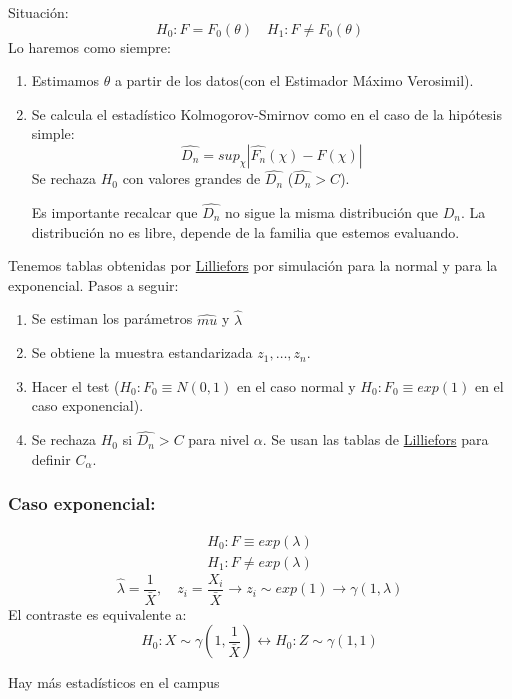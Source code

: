 Situación:
\[
H_0: F=F_0(\theta) \quad H_1:F \neq F_0(\theta)
\]
Lo haremos como siempre:
\begin{enumerate}
    \item Estimamos $\theta$ a partir de los datos(con el Estimador Máximo Verosimil).
    \item Se calcula el estadístico Kolmogorov-Smirnov como en el caso de la hipótesis simple:
    \[
    \widehat{D_n}=sup_\chi|\widehat{F_n}(\chi)-F(\chi)|
    \]
    Se rechaza $H_0$ con valores grandes de $\widehat{D_n}$ ($\widehat{D_n}>C$). 
    
    Es importante recalcar que $\widehat{D_n}$ no sigue la misma distribución que $D_n$.
    La distribución no es libre, depende de la familia que estemos evaluando.
\end{enumerate}

Tenemos tablas obtenidas por \href{https://es.wikipedia.org/wiki/Prueba_de_Lilliefors}{Lilliefors}
por simulación para la normal y para la exponencial.
Pasos a seguir:
\begin{enumerate}
    \item Se estiman los parámetros $\widehat{mu}$ y $\widehat{\lambda}$
    \item Se obtiene la muestra estandarizada $z_1,\dots,z_n$.
    \item Hacer el test ($H_0:F_0 \equiv N(0,1)$ en el caso normal y $H_0:F_0\equiv exp(1)$ en el caso exponencial).
    \item Se rechaza $H_0$ si $\widehat{D_n}>C$ para nivel $\alpha$. Se usan las tablas de \href{https://es.wikipedia.org/wiki/Prueba_de_Lilliefors}{Lilliefors}
    para definir $C_\alpha$.
\end{enumerate}


\subsubsection*{Caso exponencial:}

\[
\begin{matrix}
    H_0:F \equiv exp(\lambda) \\
    H_1:F \neq exp(\lambda)
\end{matrix}
\]
\[
\widehat{\lambda}=\frac{1}{\bar{X}}, \quad z_i
=\frac{X_i}{\bar{X}} \to z_i \sim exp(1) \longrightarrow\gamma(1,\lambda)
\]
El contraste es equivalente a:
\[
H_0: X \sim \gamma\left(1,\frac{1}{\bar{X}}\right) \longleftrightarrow H_0:Z \sim \gamma(1,1)
\]

Hay más estadísticos en el campus

